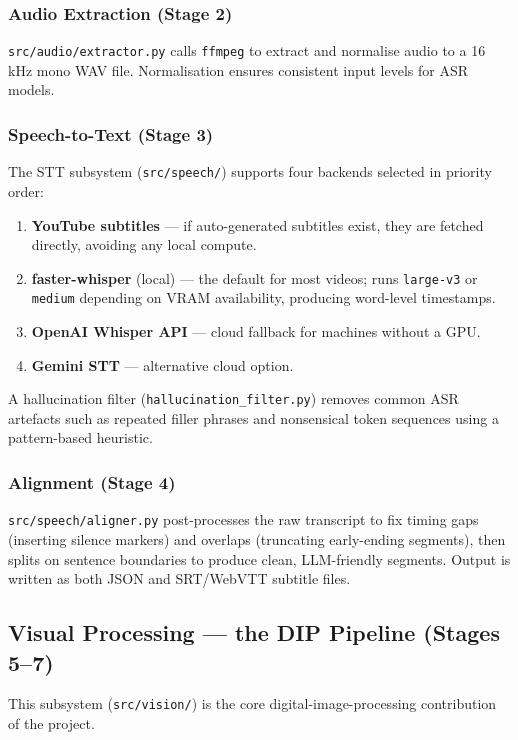 \documentclass[12pt,a4paper]{article}
\begin{document}
\subsubsection{Audio Extraction (Stage 2)}
\texttt{src/audio/extractor.py} calls \texttt{ffmpeg} to extract and normalise audio
to a 16 kHz mono WAV file. Normalisation ensures consistent input levels for ASR models.

\subsubsection{Speech-to-Text (Stage 3)}
The STT subsystem (\texttt{src/speech/}) supports four backends selected in priority
order:
\begin{enumerate}[leftmargin=*]
  \item \textbf{YouTube subtitles} — if auto-generated subtitles exist, they are fetched
    directly, avoiding any local compute.
  \item \textbf{faster-whisper} (local) — the default for most videos; runs
    \texttt{large-v3} or \texttt{medium} depending on VRAM availability, producing
    word-level timestamps.
  \item \textbf{OpenAI Whisper API} — cloud fallback for machines without a GPU.
  \item \textbf{Gemini STT} — alternative cloud option.
\end{enumerate}

A hallucination filter (\texttt{hallucination\_filter.py}) removes common ASR
artefacts such as repeated filler phrases and nonsensical token sequences using a
pattern-based heuristic.

\subsubsection{Alignment (Stage 4)}
\texttt{src/speech/aligner.py} post-processes the raw transcript to fix timing gaps
(inserting silence markers) and overlaps (truncating early-ending segments), then
splits on sentence boundaries to produce clean, LLM-friendly segments. Output is
written as both JSON and SRT/WebVTT subtitle files.

\subsection{Visual Processing — the DIP Pipeline (Stages 5--7)}
\label{subsec:dip}

This subsystem (\texttt{src/vision/}) is the core digital-image-processing contribution
of the project.
\end{document}
